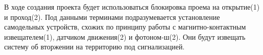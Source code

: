 В ходе создания проекта будет использоваться блокировка проема на открытие(1) и проход(2). Под данными терминами подразумевается установление самодельных устройств, схожих по принципу работы с магнитно-контактным извещателем(1), датчиком движения(2) и фотоном-ш(2). Они будут извещать систему об вторжении на территорию под сигнализацией. 
